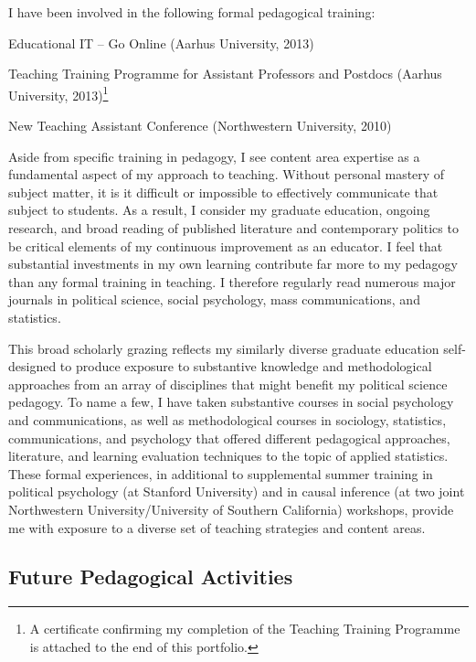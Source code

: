 \documentclass[12pt]{article}
\begin{document}
I have been involved in the following formal pedagogical training:

\begin{itemize*}
\item Educational IT -- Go Online (Aarhus University, 2013)
\item Teaching Training Programme for Assistant Professors and Postdocs (Aarhus University, 2013)\footnote{A certificate confirming my completion of the Teaching Training Programme is attached to the end of this portfolio.}
\item New Teaching Assistant Conference (Northwestern University, 2010)
\end{itemize*}

Aside from specific training in pedagogy, I see content area expertise as a fundamental aspect of my approach to teaching. Without personal mastery of subject matter, it is it difficult or impossible to effectively communicate that subject to students. As a result, I consider my graduate education, ongoing research, and broad reading of published literature and contemporary politics to be critical elements of my continuous improvement as an educator. I feel that substantial investments in my own learning contribute far more to my pedagogy than any formal training in teaching. I therefore regularly read numerous major journals in political science, social psychology, mass communications, and statistics.

This broad scholarly grazing reflects my similarly diverse graduate education self-designed to produce exposure to substantive knowledge and methodological approaches from an array of disciplines that might benefit my political science pedagogy. To name a few, I have taken substantive courses in social psychology and communications, as well as methodological courses in sociology, statistics, communications, and psychology that offered different pedagogical approaches, literature, and learning evaluation techniques to the topic of applied statistics. These formal experiences, in additional to supplemental summer training in political psychology (at Stanford University) and in causal inference (at two joint Northwestern University/University of Southern California) workshops, provide me with exposure to a diverse set of teaching strategies and content areas.

\subsection{Future Pedagogical Activities}
\end{document}
